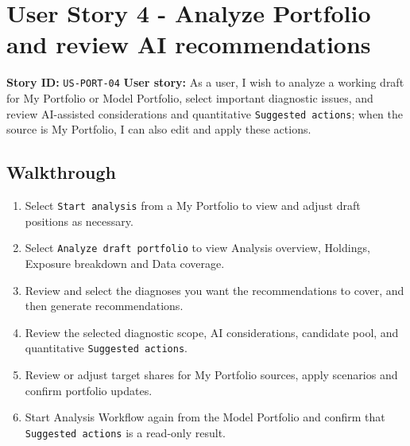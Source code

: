 \section{User Story 4 - Analyze Portfolio and review AI recommendations}
\textbf{Story ID:} \texttt{US-PORT-04}
\textbf{User story:} As a user, I wish to analyze a working draft for My Portfolio or Model Portfolio, select important diagnostic issues, and review AI-assisted considerations and quantitative \texttt{Suggested actions}; when the source is My Portfolio, I can also edit and apply these actions.
\subsection{Walkthrough}
\begin{enumerate}
\item Select \texttt{Start analysis} from a My Portfolio to view and adjust draft positions as necessary.
\item Select \texttt{Analyze draft portfolio} to view Analysis overview, Holdings, Exposure breakdown and Data coverage.
\item Review and select the diagnoses you want the recommendations to cover, and then generate recommendations.
\item Review the selected diagnostic scope, AI considerations, candidate pool, and quantitative \texttt{Suggested actions}.
\item Review or adjust target shares for My Portfolio sources, apply scenarios and confirm portfolio updates.
\item Start Analysis Workflow again from the Model Portfolio and confirm that \texttt{Suggested actions} is a read-only result.
\end{enumerate}
